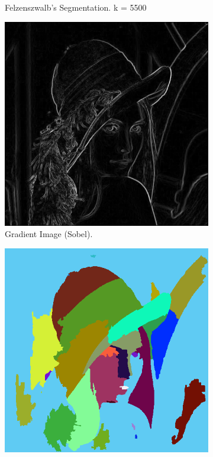 \documentclass{sbc2023}
\begin{document}
\begin{figure}[H]
\begin{subfigure}[b]{0.15\textwidth}
            \caption{Felzenszwalb's Segmentation. k = 5500}
            \label{fig:lenna_felzenszwalb_exp} %
        \end{subfigure}
    \hfill
        \begin{subfigure}[b]{0.16\textwidth}
            \includegraphics[width=\textwidth]{imgs/lennaGray_gradient.png}
            \caption{Gradient Image (Sobel).}
            \label{fig:lenna_gradient_exp} %
        \end{subfigure}
    \hfill
        \begin{subfigure}[b]{0.15\textwidth}
            \includegraphics[width=\textwidth]{imgs/lennaGray_ift_watershed.png}

\end{subfigure}
\end{figure}
\end{document}

